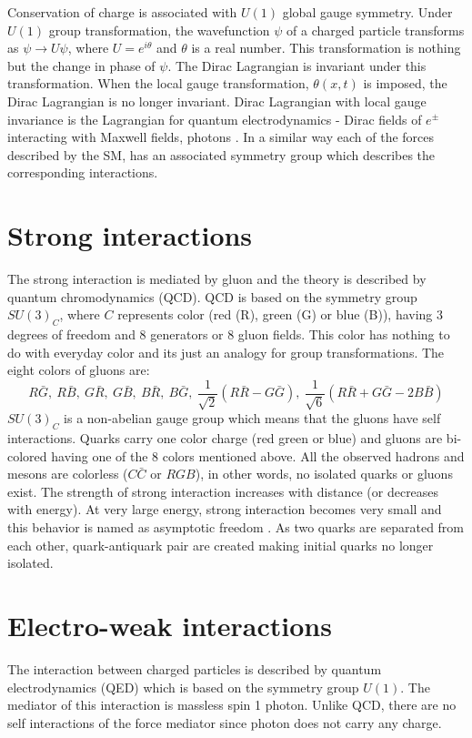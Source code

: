 Conservation of charge is associated with $U(1)$ global gauge symmetry. Under $U(1)$ group transformation, the wavefunction $\psi$ of a 
charged particle transforms as $\psi \to U\psi$, where $U = e^{i\theta}$ and $\theta$ is a real number. This transformation is nothing but 
the change in phase of $\psi$. The Dirac Lagrangian is invariant under this transformation. When the local gauge transformation, 
$\theta(x,t)$ is imposed, the Dirac Lagrangian is no longer invariant. Dirac Lagrangian with local gauge invariance is the Lagrangian for 
quantum electrodynamics - Dirac fields of $e^\pm$ interacting with Maxwell fields, photons \cite{Griffiths:2008zz}.
In a similar way each of the forces described by the SM, has an associated symmetry group which describes the corresponding interactions.

\section{Strong interactions}
The strong interaction is mediated by gluon and the theory is described by quantum chromodynamics (QCD). QCD is based on the symmetry group $SU(3)_C$, where $C$ represents color (red (R), green (G) or blue (B)), having 3 degrees of freedom and 8 generators or 8 gluon fields. 
This color has nothing to do with everyday color and its just an analogy for group transformations. The eight colors of gluons are:
\begin{equation*}
R\bar{G},\ R\bar{B},\ G\bar{R},\ G\bar{B},\ B\bar{R},\ B\bar{G},\ \frac{1}{\sqrt{2}}(R\bar{R}-G\bar{G}),\ \frac{1}{\sqrt{6}}(R\bar{R}+G\bar{G}-2B\bar{B}) 
\end{equation*}
$SU(3)_C$ is a non-abelian gauge group which means that the gluons have self interactions. Quarks carry one color charge (red green or blue) and gluons are bi-colored having one of the 8 colors mentioned above. All the observed hadrons and mesons are colorless ($C\bar{C}$ or $RGB$), in other words, no isolated quarks or gluons exist. The strength of strong interaction increases with distance (or decreases with energy). At very large energy, strong interaction becomes very small and this behavior is named as asymptotic freedom \cite{PhysRevLett.30.1343}\cite{PhysRevLett.30.1346}. As two quarks are separated from each other, quark-antiquark pair are created making initial quarks no longer isolated.

\section{Electro-weak interactions}\label{sec:EWint}
The interaction between charged particles is described by quantum electrodynamics (QED) which is based on the symmetry group $U(1)$. The mediator of this interaction is massless spin 1 photon. Unlike QCD, there are no self interactions of the force mediator since photon does not carry any charge.


